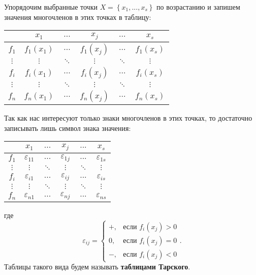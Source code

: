 Упорядочим выбранные точки $X = \left\{x_1, ... , x_s\right\}$ по возрастанию и запишем значения многочленов в этих точках в таблицу:
\begin{center}
    \begin{tabular}{ |c|c|c|c|c|c| } 
    \hline
                 & $x_1$ & $...$ & $x_j$ & $...$ & $x_s$ \\ 
    \hline
        $f_1$ & $f_1(x_1)$ & $...$ & $f_1(x_j)$ & $...$ & $f_1(x_s)$\\ 
    \hline
        $\vdots$ & $\vdots$ & $\ddots$ & $\vdots$ & $\ddots$ & $\vdots$ \\
    \hline
        $f_i$ & $f_i(x_1)$ & $...$ & $f_i(x_j)$ & $...$ & $f_i(x_s)$\\ 
    \hline
        $\vdots$ & $\vdots$ & $\ddots$ & $\vdots$ & $\ddots$ & $\vdots$ \\
    \hline
        $f_n$ & $f_n(x_1)$ & $...$ & $f_n(x_j)$ & $...$ & $f_n(x_s)$\\    
    \hline
    \end{tabular}
\end{center}
Так как нас интересуют только знаки многочленов в этих точках, то достаточно записывать лишь символ знака значения:
\begin{center}
    \begin{tabular}{ |c|c|c|c|c|c| } 
    \hline
                 & $x_1$ & $...$ & $x_j$ & $...$ & $x_s$ \\ 
    \hline
        $f_1$ & $\varepsilon_{11}$ & $...$ & $\varepsilon_{1j}$ & $...$ & $\varepsilon_{1s}$\\ 
    \hline
        $\vdots$ & $\vdots$ & $\ddots$ & $\vdots$ & $\ddots$ & $\vdots$ \\
    \hline
        $f_i$ & $\varepsilon_{i1}$ & $...$ & $\varepsilon_{ij}$ & $...$ & $\varepsilon_{is}$\\ 
    \hline
        $\vdots$ & $\vdots$ & $\ddots$ & $\vdots$ & $\ddots$ & $\vdots$ \\
    \hline
        $f_n$ & $\varepsilon_{n1}$ & $...$ & $\varepsilon_{nj}$ & $...$ & $\varepsilon_{ns}$\\    
    \hline
    \end{tabular}
\end{center}
где 
\begin{equation*}
    \varepsilon_{ij} = 
    \begin{cases}
        +, &\text{если $f_i(x_j) > 0$} \\
        0, &\text{если $f_i(x_j) = 0$} \\
        -, &\text{если $f_i(x_j) < 0$}
    \end{cases}.
\end{equation*}
Таблицы такого вида будем называть \textbf{таблицами Тарского}. 

